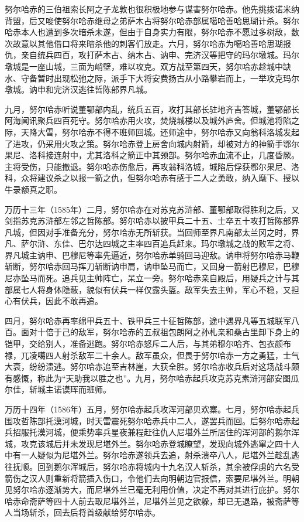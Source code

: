 努尔哈赤的三伯祖索长阿之子龙敦也很积极地参与谋害努尔哈赤。他先挑拨诺米纳背盟，后又唆使努尔哈赤继母之弟萨木占将努尔哈赤部属噶哈善哈思瑚计杀。努尔哈赤本人也遭到多次暗杀未遂，但由于自身实力有限，努尔哈赤不愿过多树敌，数次故意以其他借口将来暗杀他的刺客们放走。六月，努尔哈赤为噶哈善哈思瑚报仇，亲自统兵四百，攻打萨木占、纳木占、讷申、完济汉等把守的玛尔墩城。玛尔墩城是一座山城，三面为峭壁，难以攻克。双方战至第四天，努尔哈赤趁城中缺水、守备暂时出现松弛之际，派手下大将安费扬古从小路攀岩而上，一举攻克玛尔墩城。讷申和完济汉逃往哲陈部界凡城。

九月，努尔哈赤听说董鄂部内乱，统兵五百，攻打其部长驻地齐吉答城，董鄂部长阿海闻讯聚兵四百死守。努尔哈赤用火攻，焚烧城楼以及城外庐舍。但城池将陷之际，天降大雪，努尔哈赤不得不班师回城。还师途中，努尔哈赤又向翁科洛城发起了进攻，仍采用火攻之策。努尔哈赤登上房舍向城内射箭，却被对方的神箭手鄂尔果尼、洛科接连射中，尤其洛科之箭正中其颈部。努尔哈赤血流不止，几度昏厥。主将受伤，只能撤退。努尔哈赤伤愈后，再攻翁科洛城，城陷后俘获鄂尔果尼、洛科，众将建议杀之以报一箭之仇，但努尔哈赤有感于二人之勇敢，纳入麾下、授以牛录额真之职。

万历十三年（1585年）二月，努尔哈赤在对苏克苏浒部、董鄂部取得胜利之后，又剑指苏克苏浒部左邻之哲陈部。努尔哈赤以披甲兵二十五、士卒五十攻打哲陈部界凡城，但因对手准备充分，努尔哈赤无所斩获。当回师至界凡南部太兰冈之时，界凡、萨尔浒、东佳、巴尔达四城之主率四百追兵赶来。玛尔墩城之战的败军之将、界凡城主讷申、巴穆尼等率先逼近，努尔哈赤单骑回马迎敌。讷申将努尔哈赤马鞭斩断，努尔哈赤回马挥刀斩断讷申肩，讷申坠马而亡，又回身一箭射巴穆尼，巴穆尼亦坠马而死。追兵见主帅阵亡，呆立一旁。努尔哈赤亲自殿后，用疑兵之计与其部属七人将身体隐蔽，貌似有伏兵一样仅露头盔。敌军失去主帅，军心不稳，又担心有伏兵，因此不敢再追。

四月，努尔哈赤再率绵甲兵五十、铁甲兵三十征哲陈部，途中遇界凡等五城联军八百。面对十倍于己的敌军，努尔哈赤的五叔祖包朗阿之孙札亲和桑古里卸下身上的铠甲，交给别人，准备逃跑。努尔哈赤怒斥二人后，与其弟穆尔哈齐、包衣颜布禄，兀凌噶四人射杀敌军二十余人。敌军虽众，但畏于努尔哈赤一方之勇猛，士气大衰，纷纷溃逃。努尔哈赤追至吉林崖，大获全胜。努尔哈赤收兵后对这场战斗颇有感慨，称此为“天助我以胜之也”。九月，努尔哈赤起兵攻克苏克素浒河部安图瓜尔佳，斩城主诺谟珲而班师。

万历十四年（1586年）五月，努尔哈赤起兵攻浑河部贝欢寨。七月，努尔哈赤起兵围攻哲陈部托漠河城，时天雷震死努尔哈赤兵中二人，遂罢兵而回。后努尔哈赤起兵招服托漠河城，便乘势率兵星夜兼程赶往仇人尼堪外兰所居住的浑河部的鹅尔浑城，攻克该城后并未发现尼堪外兰。努尔哈赤登城瞭望，发现向城外逃窜之四十人中有一人疑似为尼堪外兰。努尔哈赤遂领兵去追，射杀溃卒八人，尼堪外兰趁乱逃往抚顺。回到鹅尔浑城后，努尔哈赤将城内十九名汉人斩杀，其余被俘虏的六名受箭伤之汉人则重新将箭插入伤口，令他们去向明朝边官报信，索要尼堪外兰。明朝见努尔哈赤逐渐势大，而尼堪外兰已毫无利用价值，决定不再对其进行庇护。努尔哈赤命斋萨等四十人前去取尼堪外兰，尼堪外兰见之欲躲，却已无退路，被斋萨等人当场斩杀，回去后将首级献给努尔哈赤。

